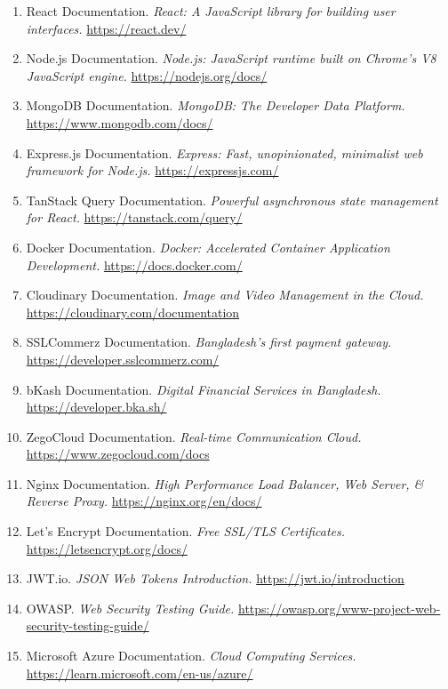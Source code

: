 \documentclass[12pt,a4paper]{article}
\begin{document}
\begin{enumerate}[noitemsep]
  \item React Documentation. \textit{React: A JavaScript library for building user interfaces.} \url{https://react.dev/}
  
  \item Node.js Documentation. \textit{Node.js: JavaScript runtime built on Chrome's V8 JavaScript engine.} \url{https://nodejs.org/docs/}
  
  \item MongoDB Documentation. \textit{MongoDB: The Developer Data Platform.} \url{https://www.mongodb.com/docs/}
  
  \item Express.js Documentation. \textit{Express: Fast, unopinionated, minimalist web framework for Node.js.} \url{https://expressjs.com/}
  
  \item TanStack Query Documentation. \textit{Powerful asynchronous state management for React.} \url{https://tanstack.com/query/}
  
  \item Docker Documentation. \textit{Docker: Accelerated Container Application Development.} \url{https://docs.docker.com/}
  
  \item Cloudinary Documentation. \textit{Image and Video Management in the Cloud.} \url{https://cloudinary.com/documentation}
  
  \item SSLCommerz Documentation. \textit{Bangladesh's first payment gateway.} \url{https://developer.sslcommerz.com/}
  
  \item bKash Documentation. \textit{Digital Financial Services in Bangladesh.} \url{https://developer.bka.sh/}
  
  \item ZegoCloud Documentation. \textit{Real-time Communication Cloud.} \url{https://www.zegocloud.com/docs}
  
  \item Nginx Documentation. \textit{High Performance Load Balancer, Web Server, \& Reverse Proxy.} \url{https://nginx.org/en/docs/}
  
  \item Let's Encrypt Documentation. \textit{Free SSL/TLS Certificates.} \url{https://letsencrypt.org/docs/}
  
  \item JWT.io. \textit{JSON Web Tokens Introduction.} \url{https://jwt.io/introduction}
  
  \item OWASP. \textit{Web Security Testing Guide.} \url{https://owasp.org/www-project-web-security-testing-guide/}
  
  \item Microsoft Azure Documentation. \textit{Cloud Computing Services.} \url{https://learn.microsoft.com/en-us/azure/}
\end{enumerate}

\end{document}
